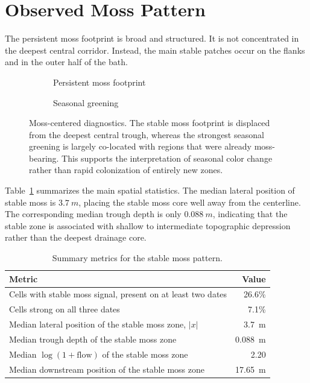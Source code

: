 \documentclass[11pt,a4paper]{article}
\begin{document}
\section{Observed Moss Pattern}

The persistent moss footprint is broad and structured. It is not concentrated in
the deepest central corridor. Instead, the main stable patches occur on the
flanks and in the outer half of the bath.

\begin{figure}[H]
  \centering
  \begin{subfigure}[t]{0.46\linewidth}
    \centering
    \caption{Persistent moss footprint}
  \end{subfigure}
  \hfill
  \begin{subfigure}[t]{0.46\linewidth}
    \centering
    \caption{Seasonal greening}
  \end{subfigure}
  \caption{Moss-centered diagnostics. The stable moss footprint is displaced
  from the deepest central trough, whereas the strongest seasonal greening is
  largely co-located with regions that were already moss-bearing. This supports
  the interpretation of seasonal color change rather than rapid colonization of
  entirely new zones.}
  \label{fig:persistent-and-greening}
\end{figure}

Table~\ref{tab:summary} summarizes the main spatial statistics. The median
lateral position of stable moss is \(\SI{3.7}{m}\), placing the stable moss core
well away from the centerline. The corresponding median trough depth is only
\(\SI{0.088}{m}\), indicating that the stable zone is associated with shallow to
intermediate topographic depression rather than the deepest drainage core.

\begin{table}[H]
  \centering
  \caption{Summary metrics for the stable moss pattern.}
  \label{tab:summary}
  \begin{tabular}{>{\raggedright\arraybackslash}p{9.5cm}r}
    \toprule
    Metric & Value \\
    \midrule
    Cells with stable moss signal, present on at least two dates & 26.6\% \\
    Cells strong on all three dates & 7.1\% \\
    Median lateral position of the stable moss zone, \(|x|\) & \SI{3.7}{m} \\
    Median trough depth of the stable moss zone & \SI{0.088}{m} \\
    Median \(\log(1+\mathrm{flow})\) of the stable moss zone & 2.20 \\
    Median downstream position of the stable moss zone & \SI{17.65}{m} \\
    \bottomrule
  \end{tabular}
\end{table}
\end{document}
